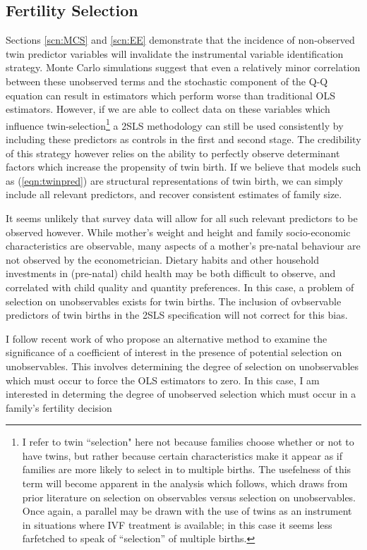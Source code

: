 \documentclass{article}[11pt,subeqn]
\begin{document}
\begin{spacing}{1.25}
\subsection{Fertility Selection}
Sections \ref{scn:MCS} and \ref{scn:EE} demonstrate that the incidence of non-observed twin predictor variables will invalidate the instrumental variable identification strategy.  Monte Carlo simulations suggest that even a relatively minor correlation between these unobserved terms and the stochastic component of the Q-Q equation can result in estimators which perform worse than traditional OLS estimators.  However, if we are able to collect data on these variables which influence twin-selection\footnote{I refer to twin ``selection" here not because families choose whether or not to have twins, but rather because certain characteristics make it appear as if families are more likely to select in to multiple births.  The usefelness of this term will become apparent in the analysis which follows, which draws from prior literature on selection on observables versus selection on unobservables.  Once again, a parallel may be drawn with the use of twins as an instrument in situations where IVF treatment is available; in this case it seems less farfetched to speak of ``selection'' of multiple births.} a 2SLS methodology can still be used consistently by including these predictors as controls in the first and second stage.  The credibility of this strategy however relies on the ability to perfectly observe determinant factors which increase the propensity of twin birth.  If we believe that models such as (\ref{eqn:twinpred}) are structural representations of twin birth, we can simply include all relevant predictors, and recover consistent estimates of family size.

It seems unlikely that survey data will allow for all such relevant predictors to be observed however.  While mother's weight and height and family socio-economic characteristics are observable, many aspects of a mother's pre-natal behaviour are not observed by the econometrician.  Dietary habits and other household investments in (pre-natal) child health may be both difficult to observe, and correlated with child quality and quantity preferences.  In this case, a problem of selection on unobservables exists for twin births.  The inclusion of ovbservable predictors of twin births in the 2SLS specification will not correct for this bias.

I follow recent work of \citet{Altonjietal2005, Altonjietal2008} who propose an alternative method to examine the significance of a coefficient of interest in the presence of potential selection on unobservables.  This involves determining the degree of selection on unobservables which must occur to force the OLS estimators to zero.  In this case, I am interested in determing the degree of unobserved selection which must occur in a family's fertility decision 




\end{spacing}
\end{document}
